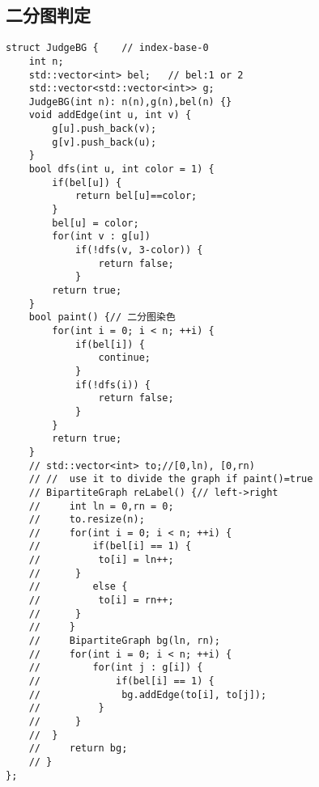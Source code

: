 \subsection{二分图判定}
\begin{lstlisting}
struct JudgeBG {	// index-base-0
    int n;
    std::vector<int> bel;	// bel:1 or 2
    std::vector<std::vector<int>> g;
    JudgeBG(int n): n(n),g(n),bel(n) {}
    void addEdge(int u, int v) {
        g[u].push_back(v);
        g[v].push_back(u);
    }
    bool dfs(int u, int color = 1) {
        if(bel[u]) {
			return bel[u]==color;
		}
        bel[u] = color;
        for(int v : g[u])
            if(!dfs(v, 3-color)) {
				return false;
			} 
        return true;
    }
    bool paint() {// 二分图染色
        for(int i = 0; i < n; ++i) {
            if(bel[i]) {
				continue;
			}
            if(!dfs(i)) {
				return false;
			}
        }
        return true;
    }
    // std::vector<int> to;//[0,ln), [0,rn)
    // //  use it to divide the graph if paint()=true
    // BipartiteGraph reLabel() {// left->right
    //     int ln = 0,rn = 0;
    //     to.resize(n);
    //     for(int i = 0; i < n; ++i) {
    //         if(bel[i] == 1) {
	// 			to[i] = ln++;
	// 		}
    //         else {
	// 			to[i] = rn++;
	// 		}
    //     }
    //     BipartiteGraph bg(ln, rn);
    //     for(int i = 0; i < n; ++i) {
    //         for(int j : g[i]) {
    //             if(bel[i] == 1) {
	// 				bg.addEdge(to[i], to[j]); 
	// 			}
	// 		}
	// 	}
    //     return bg;
    // }
};
\end{lstlisting}


